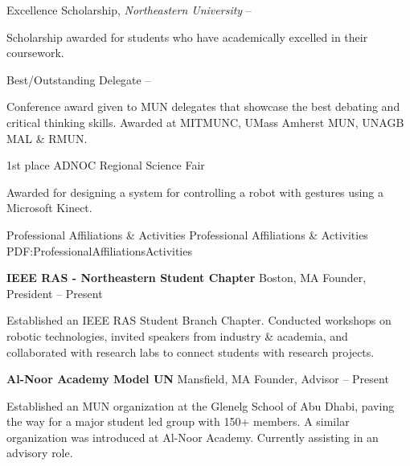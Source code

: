 \documentclass[letterpaper,MMMyyyy,nonstopmode]{simpleresumecv}
\begin{document}
\begin{Body}
\Gap
\BulletItem
Excellence Scholarship,
\textit{Northeastern University}
\hfill
{} -- 
\begin{Detail}
\Item
Scholarship awarded for students who have academically excelled in their coursework.
\end{Detail}

\Gap
\BulletItem 
Best/Outstanding Delegate
\hfill
{} --
\begin{Detail}
\Item
Conference award given to MUN delegates that showcase the best debating and critical thinking skills.
\Item
Awarded at MITMUNC, UMass Amherst MUN, UNAGB MAL \& RMUN.
\end{Detail}

\Gap
\BulletItem
1st place ADNOC Regional Science Fair
\hfill
{}
\begin{Detail}
\Item
Awarded for designing a system for controlling a robot with gestures using a Microsoft Kinect.
\end{Detail}


\Section
{Professional Affiliations\newline
\& Activities}
{Professional Affiliations \& Activities}
{PDF:ProfessionalAffiliationsActivities}

\Entry
\textbf{IEEE RAS - Northeastern Student Chapter}
\newline
Boston, MA
\Gap
\BulletItem
Founder, President
\hfill
{} --
Present
\begin{Detail}
\Item
Established an IEEE RAS Student Branch Chapter. Conducted workshops on robotic technologies, invited speakers from industry \& academia, and collaborated with research labs to connect students with research projects.
\end{Detail}

\Entry
\textbf{Al-Noor Academy Model UN}
\newline
Mansfield, MA
\Gap
\BulletItem
Founder, Advisor
\hfill
{} --
Present
\begin{Detail}
\Item
Established an MUN organization at the Glenelg School of Abu Dhabi, paving the way for a major student led
group with 150+ members. A similar organization was introduced at Al-Noor Academy. Currently assisting in an advisory role.
\end{Detail}


\end{Body}
\end{document}
